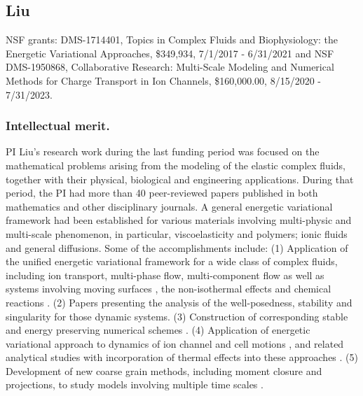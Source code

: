 \documentclass[11pt]{NSFamsart}
\begin{document}
\subsection*{Liu} NSF grants: DMS-1714401,  Topics in Complex Fluids and Biophysiology: the Energetic Variational Approaches, \$349,934, 7/1/2017 - 6/31/2021 and 
{NSF DMS-1950868, Collaborative Research: Multi-Scale Modeling and Numerical Methods for Charge Transport in Ion Channels, \$160,000.00, 8/15/2020 - 7/31/2023.}

 \subsubsection*{Intellectual merit.}  
PI Liu's research work during the last funding period was focused on the mathematical problems
arising from the modeling of the elastic complex fluids, together
with their physical, biological and engineering applications.
During that period, the PI had more than 40 peer-reviewed papers published in both mathematics and  other disciplinary journals. A general energetic variational framework had been established for various materials
involving multi-physic and multi-scale phenomenon,  in particular, viscoelasticity and polymers;  ionic fluids and general diffusions.
Some of the accomplishments include: (1) Application of the unified energetic variational framework for a wide class of complex fluids, including ion transport, multi-phase flow,
multi-component flow as well as systems involving moving  surfaces \cite{HuLiLi18,
yang_thermodynamically_2018,benesova_existence_2018, deng_largest_2017,xu_strong_2017,benesova_existence_2018,liu_energetic_2019, Kirshtein2020}, the non-isothermal effects \cite{de2019non,liu2018non, hsieh2020global, Jan-Eric}
and chemical reactions \cite{terebus2018discrete, wang2020field}. 
(2) Papers \cite{liu_energetic_2019, epshteyn2019large, Jan-Eric, hsieh2020global} presenting the analysis of the well-posedness, stability and singularity
for those dynamic systems. (3) Construction of corresponding stable and energy preserving numerical schemes \cite{duan_numerical_2019,xu_numerical_2019,duan_numerical_2019-2, wu2019energetic, liu2020lagrangian, liu2020variational, liu2020structure,duan2020structure}.
 (4)  Application of energetic variational approach to dynamics of ion channel and cell motions \cite{horng_continuum_2019,gavish_bistable_2018, liu_generalized_2017},
and related analytical studies \cite{WaLiTa17, hsieh2020global} with incorporation of thermal effects into these approaches \cite{liu2018non, wu2019energetic, hsieh2020global}.  (5) Development of new coarse grain  methods, including moment closure and projections, to study models involving multiple time scales
\cite{ma_fluctuation-dissipation_2017,ma_coarse-graining_2019}.
\end{document}
